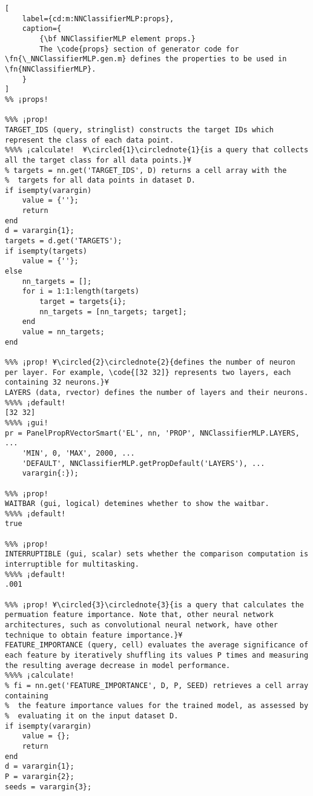 \documentclass{tufte-handout}
\begin{document}
\begin{lstlisting}[
	label={cd:m:NNClassifierMLP:props},
	caption={
		{\bf NNClassifierMLP element props.}
		The \code{props} section of generator code for \fn{\_NNClassifierMLP.gen.m} defines the properties to be used in \fn{NNClassifierMLP}.
	}
]
%% ¡props!

%%% ¡prop! 
TARGET_IDS (query, stringlist) constructs the target IDs which represent the class of each data point.
%%%% ¡calculate!  ¥\circled{1}\circlednote{1}{is a query that collects all the target class for all data points.}¥
% targets = nn.get('TARGET_IDS', D) returns a cell array with the
%  targets for all data points in dataset D.
if isempty(varargin)
    value = {''};
    return
end
d = varargin{1};
targets = d.get('TARGETS');
if isempty(targets)
    value = {''};
else
    nn_targets = [];
    for i = 1:1:length(targets)
        target = targets{i};
        nn_targets = [nn_targets; target];
    end
    value = nn_targets;
end

%%% ¡prop! ¥\circled{2}\circlednote{2}{defines the number of neuron per layer. For example, \code{[32 32]} represents two layers, each containing 32 neurons.}¥
LAYERS (data, rvector) defines the number of layers and their neurons.
%%%% ¡default!
[32 32]
%%%% ¡gui!
pr = PanelPropRVectorSmart('EL', nn, 'PROP', NNClassifierMLP.LAYERS, ...
    'MIN', 0, 'MAX', 2000, ...
    'DEFAULT', NNClassifierMLP.getPropDefault('LAYERS'), ...
    varargin{:});

%%% ¡prop!
WAITBAR (gui, logical) detemines whether to show the waitbar.
%%%% ¡default!
true

%%% ¡prop!
INTERRUPTIBLE (gui, scalar) sets whether the comparison computation is interruptible for multitasking.
%%%% ¡default!
.001

%%% ¡prop! ¥\circled{3}\circlednote{3}{is a query that calculates the permuation feature importance. Note that, other neural network architectures, such as convolutional neural network, have other technique to obtain feature importance.}¥
FEATURE_IMPORTANCE (query, cell) evaluates the average significance of each feature by iteratively shuffling its values P times and measuring the resulting average decrease in model performance.
%%%% ¡calculate!
% fi = nn.get('FEATURE_IMPORTANCE', D, P, SEED) retrieves a cell array containing
%  the feature importance values for the trained model, as assessed by
%  evaluating it on the input dataset D.
if isempty(varargin)
    value = {};
    return
end
d = varargin{1};
P = varargin{2};
seeds = varargin{3};


\end{lstlisting}
\end{document}
